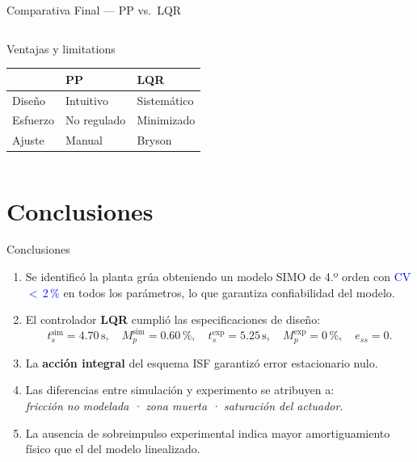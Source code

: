 \documentclass[mathserif,spanish,10pt]{beamer}
\newcommand{\good}[1]{\textcolor{blue}{#1}}
\begin{document}
\begin{frame}{Comparativa Final — PP vs.\ LQR}
\begin{columns}[T]
    \begin{block}{Ventajas y limitations}
      \scriptsize
      \centering
      \vspace{4pt}
      \begin{tabular}{p{0.9cm}p{1.5cm}p{1.5cm}}
        \toprule
        & \textbf{PP} & \textbf{LQR} \\
        \midrule
        Diseño       & Intuitivo    & Sistemático \\
        Esfuerzo	 & No regulado  & Minimizado \\
        Ajuste       & Manual       & Bryson \\
        \bottomrule
      \end{tabular}
    \end{block}
  \end{columns}
\end{frame}

\section{Conclusiones}

\begin{frame}{Conclusiones}
  \begin{enumerate}
    \item Se identificó la planta grúa obteniendo un modelo SIMO de 4.º orden con
          \good{CV\,$<\,$2\,\%} en todos los parámetros, lo que garantiza confiabilidad del modelo.

    \item El controlador \textbf{LQR} cumplió las especificaciones de diseño:
          \[
            t_s^{\text{sim}}=4.70\,\text{s},\quad
            M_p^{\text{sim}}=0.60\,\%,\quad
            t_s^{\text{exp}}=5.25\,\text{s},\quad
            M_p^{\text{exp}}=0\,\%,\quad
            e_{ss}=0.
          \]

    \item La \textbf{acción integral} del esquema ISF garantizó error estacionario nulo.

    \item Las diferencias entre simulación y experimento se atribuyen a:\\
          \textit{fricción no modelada · zona muerta · saturación del actuador}.

    \item La ausencia de sobreimpulso experimental indica mayor amortiguamiento
          físico que el del modelo linealizado.
  \end{enumerate}
\end{frame}
\end{document}

